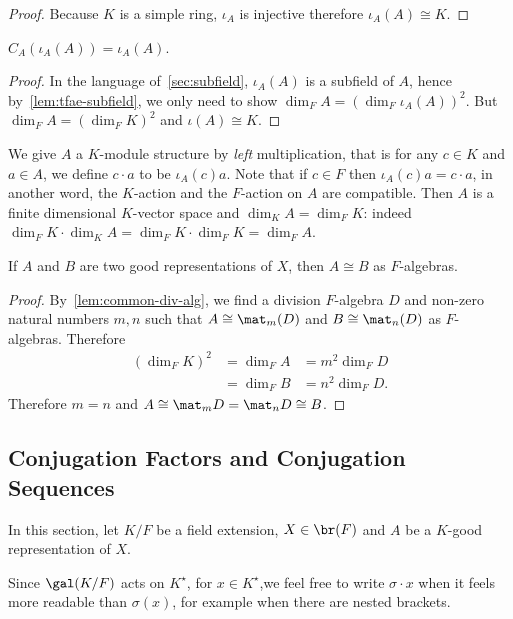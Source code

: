 \begin{proof}
  Because $K$ is a simple ring, $\iota_{A}$ is injective therefore $\iota_{A}(A)\cong K$.
\end{proof}

\begin{lemma}\label{lem:centralizer-range-good-rep}
  $C_{A}\left(\iota_{A}(A)\right) = \iota_{A}(A)$.
  \leanok
\end{lemma}
\begin{proof}
  In the language of~\cref{sec:subfield}, $\iota_{A}(A)$ is a subfield of $A$, hence by~\cref{lem:tfae-subfield}, we only need to show $\dim_{F}A = {\left(\dim_{F}\iota_{A}(A)\right)}^{2}$. But $\dim_{F}A={\left(\dim_{F}K\right)}^{2}$ and $\iota(A)\cong K$.
\end{proof}

\begin{construction}\label{con:good-rep-mod}
  We give $A$ a $K$-module structure by {\em left\/} multiplication, that is for any $c \in K$ and $a \in A$, we define $c\cdot a$ to be $\iota_{A}(c)a$. Note that if $c \in F$ then $\iota_{A}(c)a = c \cdot a$, in another word, the $K$-action and the $F$-action on $A$ are compatible. Then $A$ is a finite dimensional $K$-vector space and $\dim_{K}A=\dim_{F}K$: indeed $\dim_{F}K\cdot\dim_{K}A = \dim_{F}K\cdot \dim_{F}K = \dim_{F}A$.
  \leanok
\end{construction}

\begin{lemma}\label{lem:good-rep-iso}
  If $A$ and $B$ are two good representations of $X$, then $A \cong B$ as $F$-algebras.
  \leanok
\end{lemma}
\begin{proof}
  By~\cref{lem:common-div-alg}, we find a division $F$-algebra $D$ and non-zero natural numbers $m, n$ such that $A \cong \mat_{m}(D)$ and $B \cong \mat_{n}(D)$ as $F$-algebras. Therefore
  \[
    \begin{aligned}
      {\left(\dim_{F}K\right)}^{2} &= \dim_{F}A &= m^{2}\dim_{F}D \\
      &= \dim_{F}B &= n^{2}\dim_{F}D.
    \end{aligned}
  \]
  Therefore $m = n$ and $A \cong \mat_{m}D =\mat_{n}D\cong B$.
\end{proof}

\subsection{Conjugation Factors and Conjugation Sequences}
In this section, let $K/F$ be a field extension, $X \in \br(F)$ and $A$ be a $K$-good representation of $X$.
\begin{remark}
  Since $\gal(K/F)$ acts on $K^{\star}$, for $x\in K^{\star}$,we feel free to write $\sigma\cdot x$ when it feels more readable than $\sigma(x)$, for example when there are nested brackets.
\end{remark}



